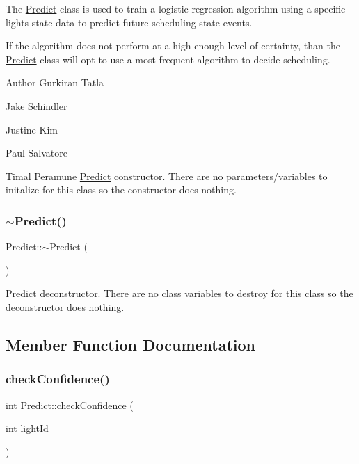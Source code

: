 The \hyperlink{class_predict}{Predict} class is used to train a logistic regression algorithm using a specific lights state data to predict future scheduling state events. 

If the algorithm does not perform at a high enough level of certainty, than the \hyperlink{class_predict}{Predict} class will opt to use a most-\/frequent algorithm to decide scheduling. \begin{DoxyAuthor}{Author}
Gurkiran Tatla 

Jake Schindler 

Justine Kim 

Paul Salvatore 

Timal Peramune \hyperlink{class_predict}{Predict} constructor. There are no parameters/variables to initalize for this class so the constructor does nothing. 
\end{DoxyAuthor}
\mbox{\label{class_predict_a735a7ad53f62ecbe74d25ba56aa893fe}} 
\subsubsection{\texorpdfstring{$\sim$\+Predict()}{~Predict()}}
{\footnotesize\ttfamily Predict\+::$\sim$\+Predict (\begin{DoxyParamCaption}{ }\end{DoxyParamCaption})\hspace{0.3cm}{\ttfamily [virtual]}}

\hyperlink{class_predict}{Predict} deconstructor. There are no class variables to destroy for this class so the deconstructor does nothing. 

\subsection{Member Function Documentation}
\mbox{\label{class_predict_a7b1ff9116156ce5bf0fb3b366833e2da}} 
\subsubsection{\texorpdfstring{check\+Confidence()}{checkConfidence()}}
{\footnotesize\ttfamily int Predict\+::check\+Confidence (\begin{DoxyParamCaption}\item[{int}]{light\+Id }\end{DoxyParamCaption})\hspace{0.3cm}{\ttfamily [static]}}

